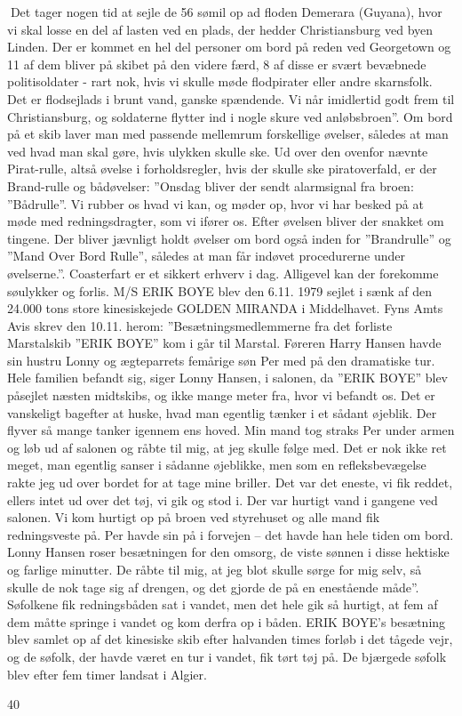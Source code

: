 Det tager nogen tid at sejle de 56 sømil op ad floden Demerara
(Guyana), hvor vi skal losse en del af lasten ved en plads, der hedder
Christiansburg ved byen Linden. Der er kommet en hel del personer om
bord på reden ved Georgetown og 11 af dem bliver på skibet på den videre
færd, 8 af disse er svært bevæbnede politisoldater - rart nok, hvis vi
skulle møde flodpirater eller andre skarnsfolk. Det er flodsejlads i
brunt vand, ganske spændende. Vi når imidlertid godt frem til
Christiansburg, og soldaterne flytter ind i nogle skure ved
anløbsbroen''. Om bord på et skib laver man med passende mellemrum
forskellige øvelser, således at man ved hvad man skal gøre, hvis ulykken
skulle ske. Ud over den ovenfor nævnte Pirat-rulle, altså øvelse i
forholdsregler, hvis der skulle ske piratoverfald, er der Brand-rulle og
bådøvelser: ''Onsdag bliver der sendt alarmsignal fra broen:
''Bådrulle''. Vi rubber os hvad vi kan, og møder op, hvor vi har besked
på at møde med redningsdragter, som vi ifører os. Efter øvelsen bliver
der snakket om tingene. Der bliver jævnligt holdt øvelser om bord også
inden for ''Brandrulle'' og ''Mand Over Bord Rulle'', således at man får
indøvet procedurerne under øvelserne.''. Coasterfart er et sikkert
erhverv i dag. Alligevel kan der forekomme søulykker og forlis. M/S ERIK
BOYE blev den 6.11. 1979 sejlet i sænk af den 24.000 tons store
kinesiskejede GOLDEN MIRANDA i Middelhavet. Fyns Amts Avis skrev den
10.11. herom: ''Besætningsmedlemmerne fra det forliste Marstalskib
''ERIK BOYE'' kom i går til Marstal. Føreren Harry Hansen havde sin
hustru Lonny og ægteparrets femårige søn Per med på den dramatiske tur.
Hele familien befandt sig, siger Lonny Hansen, i salonen, da ''ERIK
BOYE'' blev påsejlet næsten midtskibs, og ikke mange meter fra, hvor vi
befandt os. Det er vanskeligt bagefter at huske, hvad man egentlig
tænker i et sådant øjeblik. Der flyver så mange tanker igennem ens
hoved. Min mand tog straks Per under armen og løb ud af salonen og råbte
til mig, at jeg skulle følge med. Det er nok ikke ret meget, man
egentlig sanser i sådanne øjeblikke, men som en refleksbevægelse rakte
jeg ud over bordet for at tage mine briller. Det var det eneste, vi fik
reddet, ellers intet ud over det tøj, vi gik og stod i. Der var hurtigt
vand i gangene ved salonen. Vi kom hurtigt op på broen ved styrehuset og
alle mand fik redningsveste på. Per havde sin på i forvejen -- det havde
han hele tiden om bord. Lonny Hansen roser besætningen for den omsorg,
de viste sønnen i disse hektiske og farlige minutter. De råbte til mig,
at jeg blot skulle sørge for mig selv, så skulle de nok tage sig af
drengen, og det gjorde de på en enestående måde''. Søfolkene fik
redningsbåden sat i vandet, men det hele gik så hurtigt, at fem af dem
måtte springe i vandet og kom derfra op i båden. ERIK BOYE's besætning
blev samlet op af det kinesiske skib efter halvanden times forløb i det
tågede vejr, og de søfolk, der havde været en tur i vandet, fik tørt tøj
på. De bjærgede søfolk blev efter fem timer landsat i Algier.

40
